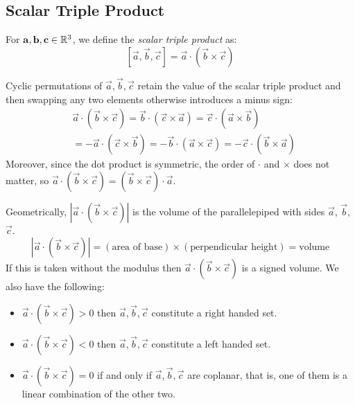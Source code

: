 \documentclass[../main.tex]{subfiles}
\begin{document}
\subsection{Scalar Triple Product}
\label{scalarTripleProduct}
\begin{definition}
  For $\mathbf{\bm{a}}, \mathbf{\bm{b}}, \mathbf{\bm{c}} \in \mathbb{R}^3$, we define the \textit{scalar triple product} as:
  \[
    [\vec{a}, \vec{b}, \vec{c}] = \vec{a} \cdot (\vec{b} \times \vec{c})
  \]
\end{definition}
Cyclic permutations of $\vec{a}, \vec{b}, \vec{c}$ retain the value of the scalar triple product and then swapping any two elements otherwise introduces a minus sign:
\begin{align*}
  &\vec{a} \cdot (\vec{b} \times \vec{c}) = \vec{b} \cdot (\vec{c} \times \vec{a}) = \vec{c} \cdot (\vec{a} \times \vec{b}) \\
  &= -\vec{a} \cdot (\vec{c} \times \vec{b}) = -\vec{b} \cdot (\vec{a} \times \vec{c}) = -\vec{c} \cdot (\vec{b} \times \vec{a})
\end{align*}
Moreover, since the dot product is symmetric, the order of $\cdot$ and $\times$ does not matter, so $\vec{a} \cdot (\vec{b} \times \vec{c}) = (\vec{b} \times \vec{c}) \cdot \vec{a}$.

Geometrically, $|\vec{a} \cdot (\vec{b} \times \vec{c})|$ is the volume of the parallelepiped with sides $\vec{a}$, $\vec{b}$, $\vec{c}$.
\[
  |\vec{a} \cdot (\vec{b} \times \vec{c})| = (\text{area of base}) \times(\text{perpendicular height}) = \text{volume}
\]
If this is taken without the modulus then $\vec{a} \cdot (\vec{b} \times \vec{c})$ is a signed volume.
We also have the following:
\begin{itemize}
  \item $\vec{a} \cdot (\vec{b} \times \vec{c}) > 0$ then $\vec{a}, \vec{b}, \vec{c}$ constitute a right handed set.
  \item $\vec{a} \cdot (\vec{b} \times \vec{c}) < 0$ then $\vec{a}, \vec{b}, \vec{c}$ constitute a left handed set.
  \item $\vec{a} \cdot (\vec{b} \times \vec{c}) = 0$ if and only if $\vec{a}, \vec{b}, \vec{c}$ are coplanar, that is, one of them is a linear combination of the other two.
\end{itemize}
\end{document}
